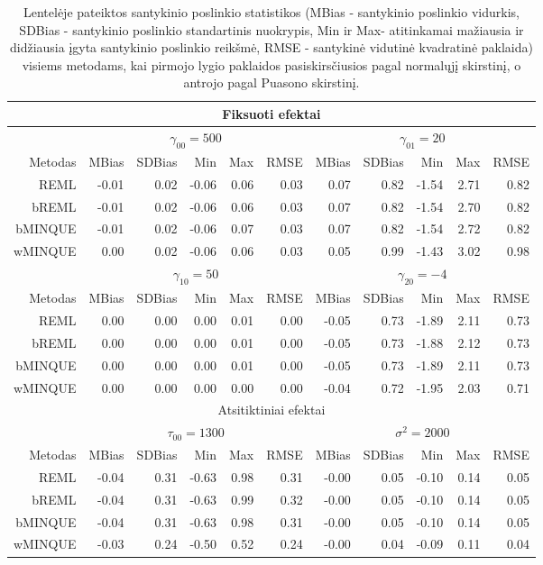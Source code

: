\documentclass[12pt,a4paper]{article}
\begin{document}
\begin{small}
\begin{table}[H]
\caption{Lentelėje pateiktos santykinio poslinkio statistikos (MBias - santykinio poslinkio vidurkis, SDBias - santykinio poslinkio standartinis nuokrypis, Min ir Max- atitinkamai mažiausia ir didžiausia įgyta santykinio poslinkio reikšmė, RMSE - santykinė vidutinė kvadratinė paklaida) visiems metodams, kai pirmojo lygio paklaidos pasiskirsčiusios pagal normalųjį skirstinį, o antrojo pagal Puasono skirstinį.}
\label{table:y2}
\centering
\begin{tabular}{r|rrrrr|rrrrr|}
\hline
\multicolumn{11}{c}{Fiksuoti efektai}\\
\hline
& \multicolumn{5}{c|}{$\gamma_{00} = 500$}&\multicolumn{5}{c|}{$\gamma_{01} = 20$}\\
\hline
Metodas & MBias & SDBias & Min & Max & RMSE & MBias & SDBias & Min & Max & RMSE\\
\hline
REML & -0.01 & 0.02 & -0.06 & 0.06 & 0.03 & 0.07 & 0.82 & -1.54 & 2.71 & 0.82 \\
bREML& -0.01 & 0.02 & -0.06 & 0.06 & 0.03& 0.07 & 0.82 & -1.54 & 2.70 & 0.82 \\
bMINQUE & -0.01 & 0.02 & -0.06 & 0.07 & 0.03& 0.07 & 0.82 & -1.54 & 2.72 & 0.82\\
wMINQUE & 0.00 & 0.02 & -0.06 & 0.06 & 0.03& 0.05 & 0.99 & -1.43 & 3.02 & 0.98\\
\hline
& \multicolumn{5}{c|}{$\gamma_{10} = 50$}&\multicolumn{5}{c|}{$\gamma_{20} = -4$}\\
\hline
Metodas & MBias & SDBias & Min & Max & RMSE & MBias & SDBias & Min & Max & RMSE\\
\hline
REML & 0.00 & 0.00 & 0.00 & 0.01 & 0.00& -0.05 & 0.73 & -1.89 & 2.11 & 0.73\\
bREML & 0.00 & 0.00 & 0.00 & 0.01 & 0.00& -0.05 & 0.73 & -1.88 & 2.12 & 0.73\\
bMINQUE & 0.00 & 0.00 & 0.00 & 0.01 & 0.00& -0.05 & 0.73 & -1.89 & 2.11 & 0.73\\
wMINQUE &0.00 & 0.00 & 0.00 & 0.00 & 0.00& -0.04 & 0.72 & -1.95 & 2.03 & 0.71\\
\hline
\multicolumn{11}{c}{Atsitiktiniai efektai}\\
\hline
& \multicolumn{5}{c|}{$\tau_{00}=1300$}&\multicolumn{5}{c|}{$\sigma^2=2000$}\\
\hline
Metodas & MBias & SDBias & Min & Max & RMSE & MBias & SDBias & Min & Max & RMSE\\
\hline
REML &-0.04 & 0.31 & -0.63 & 0.98 & 0.31& -0.00 & 0.05 & -0.10 & 0.14 & 0.05\\
bREML & -0.04 & 0.31 & -0.63 & 0.99 & 0.32& -0.00 & 0.05 & -0.10 & 0.14 & 0.05\\
bMINQUE & -0.04 & 0.31 & -0.63 & 0.98 & 0.31& -0.00 & 0.05 & -0.10 & 0.14 & 0.05\\
wMINQUE & -0.03 & 0.24 & -0.50 & 0.52 & 0.24& -0.00 & 0.04 & -0.09 & 0.11 & 0.04\\
\hline
\end{tabular}
\end{table}
\end{small}
\end{document}
